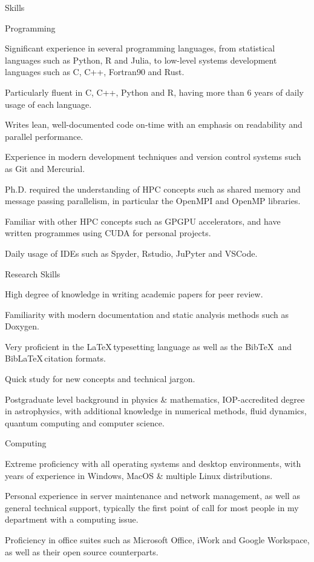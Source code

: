 \documentclass{resume} %
\begin{document}
\begin{rSection}{Skills}

\begin{rPoints}{Programming}
	\item Significant experience in several programming languages, from statistical languages such as Python, R and Julia, to low-level systems development languages such as C, C++, Fortran90 and Rust.
	\item Particularly fluent in C, C++, Python and R, having more than 6 years of daily usage of each language.
	\item Writes lean, well-documented code on-time with an emphasis on readability and parallel performance.
	\item Experience in modern development techniques and version control systems such as Git and Mercurial.
	\item Ph.D. required the understanding of HPC concepts such as shared memory and message passing parallelism, in particular the OpenMPI and OpenMP libraries.
	\item Familiar with other HPC concepts such as GPGPU accelerators, and have written programmes using CUDA for personal projects.
	\item Daily usage of IDEs such as Spyder, Rstudio, JuPyter and VSCode.
\end{rPoints}

\begin{rPoints}{Research Skills}
	\item High degree of knowledge in writing academic papers for peer review.
	\item Familiarity with modern documentation and static analysis methods such as Doxygen.
	\item Very proficient in the \LaTeX \,typesetting language as well as the Bib\TeX\, and Bib\LaTeX \,citation formats.
	\item Quick study for new concepts and technical jargon.
	\item Postgraduate level background in physics \& mathematics, IOP-accredited degree in astrophysics, with additional knowledge in numerical methods, fluid dynamics, quantum computing and computer science.
\end{rPoints}

\begin{rPoints}{Computing}
	\item Extreme proficiency with all operating systems and desktop environments, with years of experience in Windows, MacOS \& multiple Linux distributions.
	\item Personal experience in server maintenance and network management, as well as general technical support, typically the first point of call for most people in my department with a computing issue.
	\item Proficiency in office suites such as Microsoft Office, iWork and Google Workspace, as well as their open source counterparts.
\end{rPoints}


\end{rSection}
\end{document}
